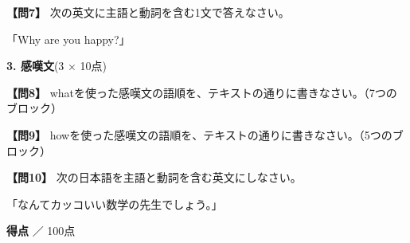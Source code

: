 \testqsep

\noindent\textbf{【問7】} 次の英文に主語と動詞を含む1文で答えなさい。

「Why are you happy?」

\testsectsep

\noindent\textbf{3. 感嘆文}(3 $\times$ 10点)

\noindent\textbf{【問8】} whatを使った感嘆文の語順を、テキストの通りに書きなさい。（7つのブロック）

\testqsep

\noindent\textbf{【問9】} howを使った感嘆文の語順を、テキストの通りに書きなさい。（5つのブロック）

\testqsep

\noindent\textbf{【問10】} 次の日本語を主語と動詞を含む英文にしなさい。

「なんてカッコいい数学の先生でしょう。」

\testqsep

\begin{flushright}
\textbf{得点} \underline{\hspace{8em}} ／ 100点
\end{flushright}
